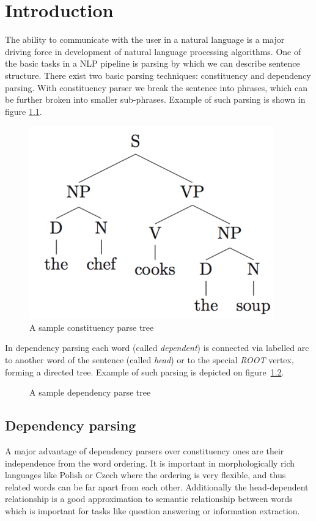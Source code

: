 \chapter{Introduction}
The ability to communicate with the user in a natural language is a major driving
force in development of natural language processing algorithms. One of the basic
tasks in a NLP pipeline is parsing by which we can describe sentence structure.
There exist two basic parsing techniques: constituency and dependency parsing.
With constituency parser we break the sentence into phrases, which can be further
broken into smaller sub-phrases. Example of such parsing is shown in figure
\ref{fig:constituency_tree}.

\begin{figure}[!htbp]
  \centering
  \includegraphics[width=0.4\linewidth]{img/examples/dep/constituent.png}
  \caption{A sample constituency parse tree} 
  \label{fig:constituency_tree}
\end{figure}

In dependency parsing each word (called \emph{dependent})
is connected via labelled arc to another word of the sentence (called \emph{head})
or to the special \emph{ROOT} vertex, forming a directed tree.
Example of such parsing is depicted on figure~\ref{fig:dependency_tree}.

\begin{figure}[!htbp]
  \centering
  \caption{A sample dependency parse tree} 
  \label{fig:dependency_tree}
\end{figure}

\section{Dependency parsing}

A major advantage of dependency parsers over constituency ones are their
independence from the word ordering. It is important in morphologically rich
languages like Polish or Czech where the ordering is very flexible, and thus
related words can be far apart from each other.
Additionally the head-dependent relationship is a good approximation to semantic
relationship between words~\cite{covington_fundamental_2001} which is important
for tasks like question answering or information extraction.

